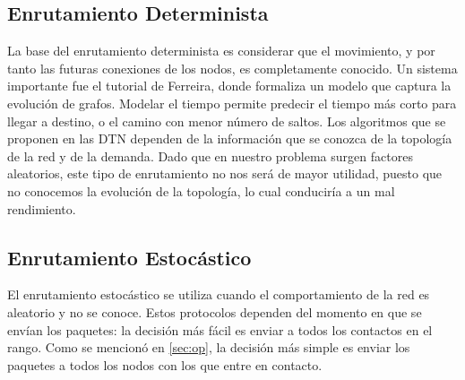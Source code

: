 \documentclass[10pt,preprint,onecolumn]{article}
\begin{document}
\subsection{Enrutamiento Determinista}

La base del enrutamiento determinista es considerar que el movimiento, y por tanto las futuras conexiones de los nodos, es completamente conocido. Un sistema importante fue el tutorial de Ferreira\cite{graphs}, donde formaliza un modelo que captura la evolución de grafos. Modelar el tiempo permite predecir el tiempo más corto para llegar a destino, o el camino con menor número de saltos.
Los algoritmos que se proponen en las DTN dependen de la información que se conozca de la topología de la red y de la demanda\cite{16}. Dado que en nuestro problema surgen factores aleatorios, este tipo de enrutamiento no nos será de mayor utilidad, puesto que no conocemos la evolución de la topología, lo cual conduciría a un mal rendimiento.

\subsection{Enrutamiento Estocástico}

El enrutamiento estocástico se utiliza cuando el comportamiento de la red es aleatorio y no se conoce. Estos protocolos dependen del momento en que se envían los paquetes: la decisión más fácil es enviar a todos los contactos en el rango.
Como se mencionó en \ref{sec:op}, la decisión más simple es enviar los paquetes a todos los nodos con los que entre en contacto.
\end{document}
